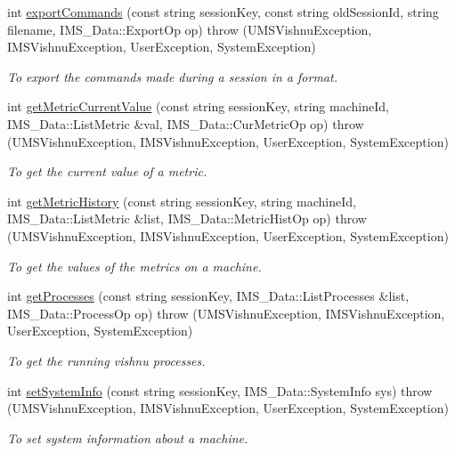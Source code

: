\begin{DoxyCompactItemize}
int \hyperlink{namespacevishnu_ac6b5cc01ba9509aa07b89dd69ada02fa}{exportCommands} (const string sessionKey, const string oldSessionId, string filename, IMS\_\-Data::ExportOp op)  throw (UMSVishnuException, IMSVishnuException, UserException, SystemException)
\begin{DoxyCompactList}\small\item\em To export the commands made during a session in a format. \item\end{DoxyCompactList}\item 
int \hyperlink{namespacevishnu_ad83c65006cee9dbbd73881089cc1f441}{getMetricCurrentValue} (const string sessionKey, string machineId, IMS\_\-Data::ListMetric \&val, IMS\_\-Data::CurMetricOp op)  throw (UMSVishnuException, IMSVishnuException, UserException, SystemException)
\begin{DoxyCompactList}\small\item\em To get the current value of a metric. \item\end{DoxyCompactList}\item 
int \hyperlink{namespacevishnu_aaec1e90bd62e865d63ed47dc7b2e7638}{getMetricHistory} (const string sessionKey, string machineId, IMS\_\-Data::ListMetric \&list, IMS\_\-Data::MetricHistOp op)  throw (UMSVishnuException, IMSVishnuException, UserException, SystemException)
\begin{DoxyCompactList}\small\item\em To get the values of the metrics on a machine. \item\end{DoxyCompactList}\item 
int \hyperlink{namespacevishnu_a9ab3615d929a06aa5e1feca1be9e49d9}{getProcesses} (const string sessionKey, IMS\_\-Data::ListProcesses \&list, IMS\_\-Data::ProcessOp op)  throw (UMSVishnuException, IMSVishnuException, UserException, SystemException)
\begin{DoxyCompactList}\small\item\em To get the running vishnu processes. \item\end{DoxyCompactList}\item 
int \hyperlink{namespacevishnu_a3b056eb0ec0ad9a7ac591ece3cac3dbd}{setSystemInfo} (const string sessionKey, IMS\_\-Data::SystemInfo sys)  throw (UMSVishnuException, IMSVishnuException, UserException, SystemException)
\begin{DoxyCompactList}\small\item\em To set system information about a machine. \item\end{DoxyCompactList}\item 

\end{DoxyCompactItemize}
